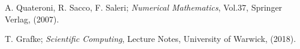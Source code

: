 \documentclass[11pt]{article}
\theoremstyle{theorem}
\theoremstyle{definition}
\begin{document}
\cleardoublepage
\begin{thebibliography}{99}

 A. Quateroni, R. Sacco, F. Saleri;
\emph{Numerical Mathematics}, Vol.37, Springer Verlag, (2007).

 T. Grafke;
\emph{Scientific Computing}, Lecture Notes, University of Warwick, (2018).







\printindex
\end{thebibliography}
\end{document}
